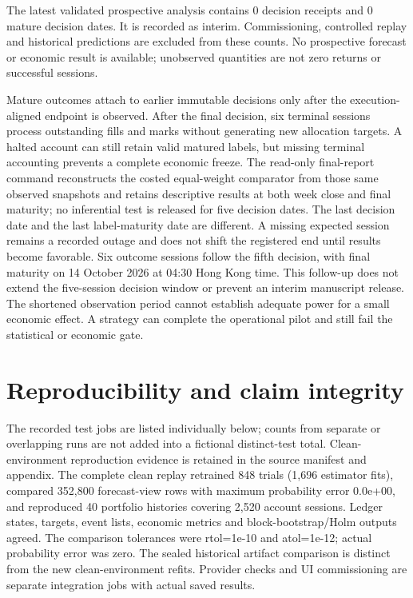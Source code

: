 \documentclass[11pt,a4paper]{article}
\begin{document}


The latest validated prospective analysis contains 0 decision receipts and 0 mature decision dates. It is recorded as interim. Commissioning, controlled replay and historical predictions are excluded from these counts. No prospective forecast or economic result is available; unobserved quantities are not zero returns or successful sessions.

Mature outcomes attach to earlier immutable decisions only after the execution-aligned endpoint is observed. After the final decision, six terminal sessions process outstanding fills and marks without generating new allocation targets. A halted account can still retain valid matured labels, but missing terminal accounting prevents a complete economic freeze. The read-only final-report command reconstructs the costed equal-weight comparator from those same observed snapshots and retains descriptive results at both week close and final maturity; no inferential test is released for five decision dates. The last decision date and the last label-maturity date are different. A missing expected session remains a recorded outage and does not shift the registered end until results become favorable. Six outcome sessions follow the fifth decision, with final maturity on 14 October 2026 at 04:30 Hong Kong time. This follow-up does not extend the five-session decision window or prevent an interim manuscript release. The shortened observation period cannot establish adequate power for a small economic effect. A strategy can complete the operational pilot and still fail the statistical or economic gate.


\section{Reproducibility and claim integrity}\label{sec:section-10}

The recorded test jobs are listed individually below; counts from separate or overlapping runs are not added into a fictional distinct-test total. Clean-environment reproduction evidence is retained in the source manifest and appendix. The complete clean replay retrained 848 trials (1,696 estimator fits), compared 352,800 forecast-view rows with maximum probability error 0.0e+00, and reproduced 40 portfolio histories covering 2,520 account sessions. Ledger states, targets, event lists, economic metrics and block-bootstrap/Holm outputs agreed. The comparison tolerances were rtol=1e-10 and atol=1e-12; actual probability error was zero. The sealed historical artifact comparison is distinct from the new clean-environment refits. Provider checks and UI commissioning are separate integration jobs with actual saved results.
\end{document}
